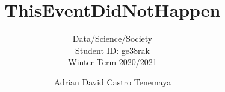 \documentclass[sigconf,nonacm]{acmart}
\begin{document}
\title{ThisEventDidNotHappen}
\subtitle{Data/Science/Society \\ Student ID: ge38rak \\ Winter Term 2020/2021}

\author{Adrian David Castro Tenemaya}

\begin{abstract}

\end{abstract}

\maketitle






\end{document}
